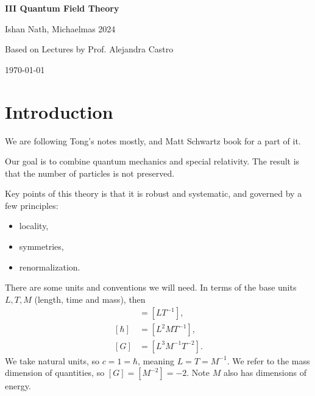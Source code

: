 \documentclass[12pt]{article}
\begin{document}
\hypersetup{pageanchor=false}
\begin{titlepage}
	\begin{center}
		\vspace*{1em}
		\Huge
		\textbf{III Quantum Field Theory}

		\vspace{1em}
		\large
		Ishan Nath, Michaelmas 2024

		\vspace{1.5em}

		\Large

		Based on Lectures by Prof. Alejandra Castro

		\vspace{1em}

		\large
		\today
	\end{center}
	
\end{titlepage}
\hypersetup{pageanchor=true}

\tableofcontents

\newpage


\setcounter{section}{-1}

\section{Introduction}%
\label{sec:intro}

We are following Tong's notes mostly, and Matt Schwartz book for a part of it.

Our goal is to combine quantum mechanics and special relativity. The result is that the number of particles is not preserved.

Key points of this theory is that it is robust and systematic, and governed by a few principles:
\begin{itemize}
	\item locality,
	\item symmetries,
	\item renormalization.
\end{itemize}

There are some units and conventions we will need. In terms of the base units $L, T, M$ (length, time and mass), then
\begin{align*}
	[c] &= [LT^{-1}], \\
	[\hbar] &= [L^2 M T^{-1}], \\
	[G] &= [L^3M^{-1}T^{-2}].
\end{align*}
We take natural units, so $c = 1 = \hbar$, meaning $L = T = M^{-1}$. We refer to the mass dimension of quantities, so $[G] = [M^{-2}] = -2$. Note $M$ also has dimensions of energy.
\end{document}
